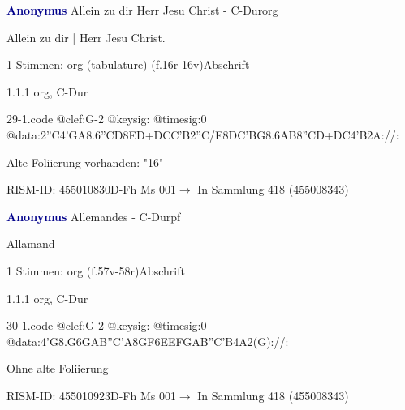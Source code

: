 \documentclass[twocolumn]{book}
\begin{document}
\par \vspace{7pt} \textcolor{darkblue}{\textbf{Anonymus  }}\hfillplus{\textbf{[29]}}\newline Allein zu dir Herr Jesu Christ - C-Dur\newline org
\par \begin{itshape}[f.16r, at left:] Allein zu dir | Herr Jesu Christ.\end{itshape} 
\par \textcolor{darkblue}{}  1 Stimmen: org (tabulature)  (f.16r-16v)\newline Abschrift
\par 1.1.1  org, C-Dur  
\begin{filecontents*}{29-1.code}
@clef:G-2
@keysig:
@timesig:0
@data:2''C4'GA{8.6''CD8ED+}{DCC'B}2''C/E{8DC'BG}{8.6AB8''CD+}{DC}4'B2A://:
\end{filecontents*}
\newline
%
\par Alte Foliierung vorhanden: "16"
\par RISM-ID: 455010830\newline D-Fh  Ms 001\newline $\rightarrow$ In Sammlung 418 (455008343)
      
\par \vspace{7pt} \textcolor{darkblue}{\textbf{Anonymus  }}\hfillplus{\textbf{[30]}}\newline Allemandes - C-Dur\newline pf
\par \begin{itshape}[f.57v, at left:] Allamand\end{itshape} 
\par \textcolor{darkblue}{}  1 Stimmen: org  (f.57v-58r)\newline Abschrift
\par 1.1.1  org, C-Dur  
\begin{filecontents*}{30-1.code}
@clef:G-2
@keysig:
@timesig:0
@data:4'G{8.G6G}{AB''C'A}{8GF}{6EEFG}{AB''C'B}4A2(G)://:
\end{filecontents*}
\newline
%
\par Ohne alte Foliierung
\par RISM-ID: 455010923\newline D-Fh  Ms 001\newline $\rightarrow$ In Sammlung 418 (455008343)
      
\end{document}
